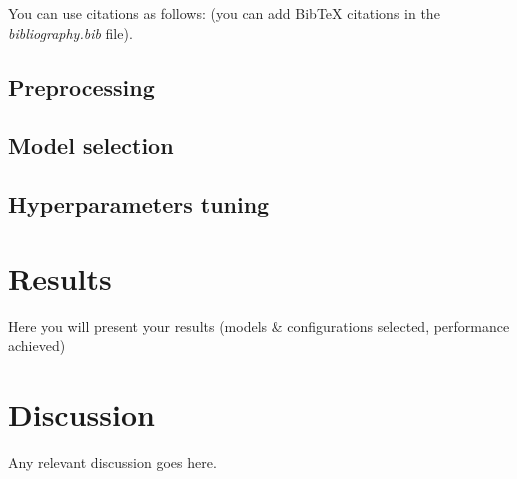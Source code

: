 \documentclass[conference]{IEEEtran}
\begin{document}
You can use citations as follows: \cite{goodfellow2016deep} (you can add BibTeX citations in the \textit{bibliography.bib} file).

\subsection{Preprocessing}
\subsection{Model selection}
\subsection{Hyperparameters tuning}

\section{Results}
Here you will present your results (models \& configurations selected, performance achieved)

\section{Discussion}
Any relevant discussion goes here.



\end{document}
